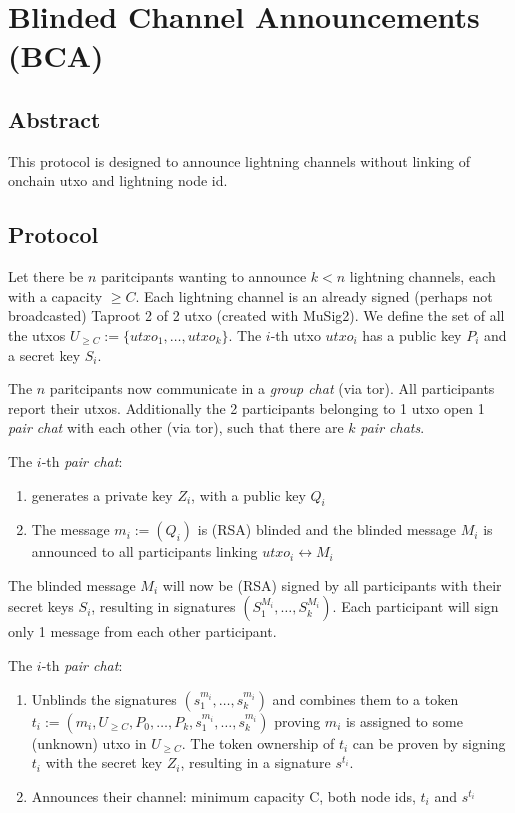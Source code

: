 \documentclass[]{article}
\begin{document}
\section{Blinded Channel Announcements    (BCA)}


\subsection{ Abstract}
This protocol is designed to announce lightning channels without linking of onchain utxo and lightning node id.

\subsection{ Protocol}

Let there be $n$ paritcipants wanting to announce $k < n $ lightning channels, each with a capacity $ \geq C $.
Each lightning channel is an already signed (perhaps not broadcasted) Taproot 2 of 2 utxo (created with MuSig2).  We define the set of all the utxos $U_{\geq C} := \{utxo_1, \dots, utxo_k  \}$.
The $i$-th utxo $utxo_i$ has a public key $P_i$ and a secret key $S_i$.

The $n$ paritcipants now communicate in a \textit{group chat} (via tor). All participants report their utxos.
Additionally the 2 participants belonging to 1 utxo open 1 \textit{pair chat} with each other (via tor), such that there are $k$ \textit{pair chats}.

The $i$-th \textit{pair chat}:
\begin{enumerate}
 \item generates a private key $Z_i$, with a public key $Q_i$
 \item The message $m_i := (Q_i)$ is (RSA) blinded and the blinded message $M_i$ is announced to all participants linking $utxo_i \leftrightarrow M_i$
\end{enumerate}



The blinded message $M_i$ will now be (RSA) signed by all participants with their secret keys $S_i$, resulting in signatures $(S_1^{M_i}, \dots, S_k^{M_i})$.  Each participant will sign only 1 message from each other participant.

The $i$-th  \textit{pair chat}:
\begin{enumerate}
 \item Unblinds the signatures $(s_1^{m_i}, \dots, s_k^{m_i})$ and combines them to a token $t_i := (m_i,U_{\geq C}, P_0, \dots, P_k,  s_1^{m_i}, \dots, s_k^{m_i})$ proving $m_i$ is assigned to some (unknown) utxo in $U_{\geq C} $. The token ownership of $t_i$ can be proven by signing $t_i$ with the secret key $Z_i$, resulting in a signature $s^{t_i}$.
 \item Announces their channel: minimum capacity C, both node ids, $t_i$ and $s^{t_i}$

\end{enumerate}
\end{document}
